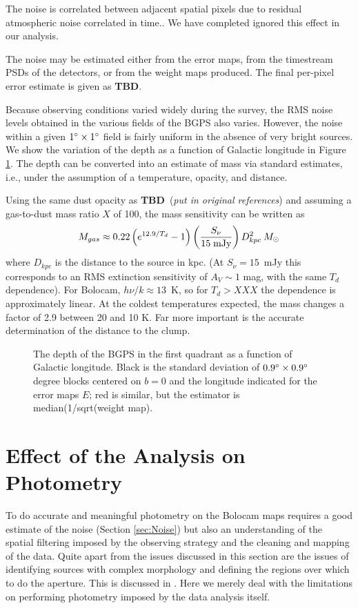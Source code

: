 \documentclass[12pt,preprint]{aastex}
\def\msol{\ifmmode {\>M_\odot}\else {$M_\odot$}\fi}
\newcommand{\TBD}{{\bf TBD}}
\def\Figure#1#2#3#4{
\begin{figure}[htb]
\epsscale{#4}
\plotone{#1}
\caption{#2}
\label{#3}
\end{figure}
}
\begin{document}
The noise is correlated between adjacent spatial pixels due to
residual atmospheric noise correlated in time..  We have completed
ignored this effect in our analysis.

The noise may be estimated either from the error maps, from the
timestream PSDs of the detectors, or from the weight maps
produced. The final per-pixel error estimate is given as \TBD.

Because observing conditions varied widely during the survey, the RMS
noise levels obtained in the various fields of the BGPS also varies.
However, the noise within a given $1\mbox{$^\circ$} \times 1\mbox{$^\circ$}$ field is
fairly uniform in the absence of very bright sources.  We show the
variation of the depth as a function of Galactic longitude in Figure
\ref{fig:NoiseVsLongitude}.  The depth can be converted into an
estimate of mass via standard estimates, i.e., under the assumption of
a temperature, opacity, and distance.

Using the same dust opacity as \TBD\ ({\it put in original references})
and assuming a gas-to-dust mass ratio $X$ of 100, the mass sensitivity
can be written as
\begin{equation} 
\label{eq:Mass}
M_{gas}\approx
0.22\left( e^{12.9/T_d}-1 \right) \left({S_\nu\over 15\; {\rm mJy}} \right)
D^{2}_{kpc} \msol 
\end{equation}
where $D_{kpc}$ is the distance to the source in kpc.  (At $S_\nu =
15$~mJy this corresponds to an RMS extinction sensitivity of $A_V\sim
1$ mag, with the same $T_d$ dependence).  For Bolocam, $h\nu/k \approx
13$~K, so for $T_d > XXX$ the dependence is approximately linear.  At
the coldest temperatures expected, the mass changes a factor of 2.9
between 20 and 10 K.  Far more important is the accurate determination
of the distance to the clump.

\Figure{survey_depth}{The depth of the BGPS in the first quadrant as a
function of Galactic longitude.  Black is the standard deviation of
$0.9\mbox{$^\circ$} \times 0.9\mbox{$^\circ$}$ degree blocks centered on $b=0$ and the
longitude indicated for the error maps $E$; red is similar, but the
estimator is median(1/sqrt(weight map).}{fig:NoiseVsLongitude}{1.0}

\section{Effect of the Analysis on Photometry}
\label{sec:Photometry}

To do accurate and meaningful photometry on the Bolocam maps requires
a good estimate of the noise (Section \ref{sec:Noise}) but also an
understanding of the spatial filtering imposed by the observing
strategy and the cleaning and mapping of the data.  Quite apart from
the issues discussed in this section are the issues of identifying
sources with complex morphology and defining the regions over which to
do the aperture.  This is discussed in \citet{rosolowsky09}.  Here we
merely deal with the limitations on performing photometry imposed by
the data analysis itself.
\end{document}
